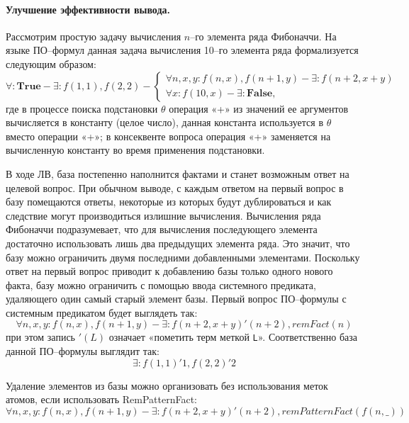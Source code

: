 \paragraph{Улучшение эффективности вывода.} Рассмотрим простую задачу вычисления $n$--го элемента ряда Фибоначчи. На языке ПО--формул данная задача вычисления 10--го элемента ряда формализуется следующим образом:
\begin{equation*}
	\forall\colon\boldsymbol{True} - \exists\colon f(1,1), f(2,2) -
	\left\lbrace
	\begin{array}{l}
		\forall n,x,y\colon f(n,x),f(n+1,y) - \exists\colon f(n+2,x+y) \\
		\forall x\colon f(10,x) - \exists\colon \boldsymbol{False},
	\end{array}\right.
\end{equation*}
где в процессе поиска подстановки $\theta$ операция «+» из значений ее аргументов вычисляется в константу (целое число), данная константа используется в $\theta$ вместо операции «+»; в консеквенте вопроса операция «+» заменяется на вычисленную константу во время применения подстановки.

В ходе ЛВ, база постепенно наполнится фактами и станет возможным ответ на целевой вопрос. При обычном выводе, с каждым ответом на первый вопрос в базу помещаются ответы, некоторые из которых будут дублироваться и как следствие могут производиться излишние вычисления. Вычисления ряда Фибоначчи подразумевает, что для вычисления последующего элемента достаточно использовать лишь два предыдущих элемента ряда. Это значит, что базу можно ограничить двумя последними добавленными элементами. Поскольку ответ на первый вопрос приводит к добавлению базы только одного нового факта, базу можно ограничить с помощью ввода системного предиката, удаляющего один самый старый элемент базы. Первый вопрос ПО--формулы с системным предикатом будет выглядеть так:
\begin{equation*}
	\forall n,x,y\colon f(n,x),f(n+1,y) - \exists\colon f(n+2,x+y)'(n+2), remFact(n)
\end{equation*}
при этом запись $'(L)$ означает «пометить терм меткой \texttt{L}». Соответственно база данной ПО--формулы выглядит так:
\begin{equation*}
\exists\colon f(1,1)'1, f(2,2)'2
\end{equation*}

Удаление элементов из базы можно организовать без использования меток атомов, если использовать RemPatternFact:
\begin{equation*}
	\forall n,x,y\colon f(n,x),f(n+1,y) - \exists\colon f(n+2,x+y)'(n+2), remPatternFact(f(n,\_))
\end{equation*}

